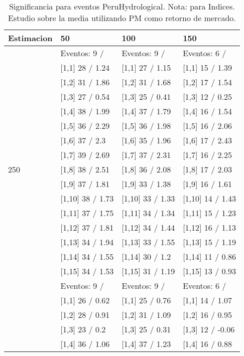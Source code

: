 \begin{table}

\caption{Significancia para eventos PeruHydrological. Nota: para Indices. Estudio sobre la media utilizando PM como retorno de mercado.}
\centering
\begin{tabular}[t]{llll}
\toprule
Estimacion & 50 & 100 & 150\\
\midrule
 & Eventos:  9 / & Eventos:  9 / & Eventos:  6 /\\
 & {}[1,1] 28  / 1.24 & {}[1,1] 27  / 1.15 & {}[1,1] 15  / 1.39\\
 & {}[1,2] 31  / 1.86 & {}[1,2] 31  / 1.68 & {}[1,2] 17  / 1.54\\
 & {}[1,3] 27  / 0.54 & {}[1,3] 25  / 0.41 & {}[1,3] 12  / 0.25\\
 & {}[1,4] 38  / 1.99 & {}[1,4] 37  / 1.79 & {}[1,4] 16  / 1.54\\
\addlinespace
 & {}[1,5] 36  / 2.29 & {}[1,5] 36  / 1.98 & {}[1,5] 16  / 2.06\\
 & {}[1,6] 37  / 2.3 & {}[1,6] 35  / 1.96 & {}[1,6] 17  / 2.43\\
 & {}[1,7] 39  / 2.69 & {}[1,7] 37  / 2.31 & {}[1,7] 16  / 2.25\\
250 & {}[1,8] 38  / 2.51 & {}[1,8] 36  / 2.08 & {}[1,8] 17  / 2.03\\
 & {}[1,9] 37  / 1.81 & {}[1,9] 33  / 1.38 & {}[1,9] 16  / 1.61\\
\addlinespace
 & {}[1,10] 38  / 1.73 & {}[1,10] 33  / 1.33 & {}[1,10] 14  / 1.43\\
 & {}[1,11] 37  / 1.75 & {}[1,11] 34  / 1.34 & {}[1,11] 15  / 1.23\\
 & {}[1,12] 37  / 1.81 & {}[1,12] 34  / 1.44 & {}[1,12] 16  / 1.13\\
 & {}[1,13] 34  / 1.94 & {}[1,13] 33  / 1.55 & {}[1,13] 15  / 1.19\\
 & {}[1,14] 34  / 1.55 & {}[1,14] 30  / 1.2 & {}[1,14] 11  / 0.86\\
\addlinespace
 & {}[1,15] 34  / 1.53 & {}[1,15] 31  / 1.19 & {}[1,15] 13  / 0.93\\
 & Eventos:  9 / & Eventos:  9 / & Eventos:  6 /\\
 & {}[1,1] 26  / 0.62 & {}[1,1] 25  / 0.76 & {}[1,1] 14  / 1.07\\
 & {}[1,2] 28  / 0.91 & {}[1,2] 31  / 1.09 & {}[1,2] 16  / 0.95\\
 & {}[1,3] 23  / 0.2 & {}[1,3] 25  / 0.31 & {}[1,3] 12  / -0.06\\
\addlinespace
 & {}[1,4] 36  / 1.06 & {}[1,4] 37  / 1.23 & {}[1,4] 16  / 0.88\\

\end{tabular}
\end{table}
